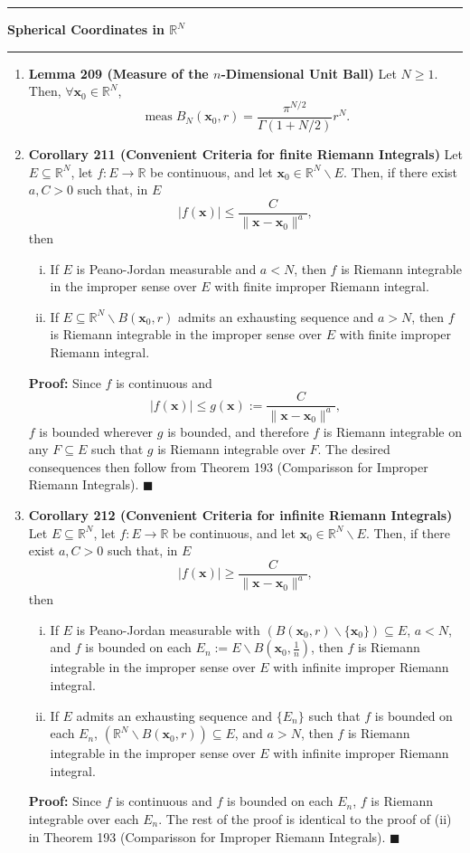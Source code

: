 \documentclass[11pt]{article}
\renewcommand{\qed}{\quad $\blacksquare$}
\newcommand{\meas}{\operatorname{meas}}
\newcommand{\bx}{\mathbf{x}}
\newcommand{\pjm}{Peano-Jordan measurable }
\newcommand{\Rint}{Riemann integrable }
\begin{document}
\hrule
{\Large \bf Spherical Coordinates in $\mathbb{R}^N$}
\vspace{1mm}
\hrule
\begin{enumerate}
\item \textbf{Lemma 209 (Measure of the $n$-Dimensional Unit Ball)}
Let $N \geq 1$. Then, $\forall \bx_0 \in \mathbb{R}^N$,
\[\meas B_N(\bx_0, r) = \frac{\pi^{N/2}}{\Gamma(1 + N/2)}r^N.\]

\item \textbf{Corollary 211 (Convenient Criteria for finite Riemann
                                                                   Integrals)}
Let $E \subseteq \mathbb{R}^N$, let $f: E \rightarrow \mathbb{R}$ be
continuous, and let $\bx_0 \in \mathbb{R}^N \backslash E$. Then, if there
exist $a,C > 0$ such that, in $E$
\[|f(\bx)| \leq \frac{C}{\|\bx - \bx_0\|^a},\] then
\begin{enumerate}[(i)]
\item If $E$ is \pjm and $a < N$, then $f$ is \Rint in the improper sense over
$E$ with finite improper Riemann integral.

\item If $E \subseteq \mathbb{R}^N \backslash B(\bx_0,r)$ admits an
exhausting sequence and $a > N$, then $f$ is \Rint in the improper sense over
$E$ with finite improper Riemann integral.
\end{enumerate}

{\bf Proof:} Since $f$ is continuous and
\[|f(\bx)| \leq g(\bx) := \frac{C}{\|\bx - \bx_0\|^a},\] $f$ is bounded
wherever $g$ is bounded, and therefore $f$ is \Rint on any $F \subseteq E$
such that $g$ is \Rint over $F$. The desired consequences then follow from
Theorem 193 (Comparisson for Improper Riemann Integrals). \qed

\item \textbf{Corollary 212 (Convenient Criteria for infinite Riemann
                                                                   Integrals)}
Let $E \subseteq \mathbb{R}^N$, let $f: E \rightarrow \mathbb{R}$ be
continuous, and let $\bx_0 \in \mathbb{R}^N \backslash E$. Then, if there
exist $a,C > 0$ such that, in $E$
\[|f(\bx)| \geq \frac{C}{\|\bx - \bx_0\|^a},\] then
\begin{enumerate}[(i)]
\item If $E$ is \pjm with $(B(\bx_0,r)\backslash\{\bx_0\}) \subseteq E$,
$a < N$, and $f$ is bounded on each $E_n := E \backslash B(\bx_0,\frac1n)$,
then $f$ is \Rint in the improper sense over $E$ with infinite improper
Riemann integral.

\item If $E$ admits an exhausting sequence and $\{E_n\}$ such that $f$ is
bounded on each $E_n$, $(\mathbb{R}^N\backslash B(\bx_0,r)) \subseteq E$, and
$a > N$, then $f$ is \Rint in the improper sense over $E$ with infinite
improper Riemann integral.
\end{enumerate}

{\bf Proof:} Since $f$ is continuous and $f$ is bounded on each $E_n$, $f$ is
\Rint over each $E_n$. The rest of the proof is identical to the proof of (ii)
in Theorem 193 (Comparisson for Improper Riemann Integrals). \qed
\end{enumerate}
\end{document}
